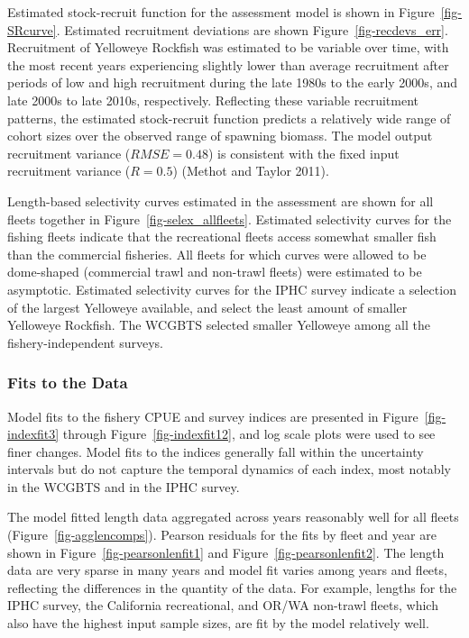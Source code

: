 \documentclass[
]{scrartcl}
\begin{document}
Estimated stock-recruit function for the assessment model is shown in
Figure~\ref{fig-SRcurve}. Estimated recruitment deviations are shown
Figure~\ref{fig-recdevs_err}. Recruitment of Yelloweye Rockfish was
estimated to be variable over time, with the most recent years
experiencing slightly lower than average recruitment after periods of
low and high recruitment during the late 1980s to the early 2000s, and
late 2000s to late 2010s, respectively. Reflecting these variable
recruitment patterns, the estimated stock-recruit function predicts a
relatively wide range of cohort sizes over the observed range of
spawning biomass. The model output recruitment variance
(\(RMSE = 0.48\)) is consistent with the fixed input recruitment
variance (\(R = 0.5\)) (Methot and Taylor 2011).

Length-based selectivity curves estimated in the assessment are shown
for all fleets together in Figure~\ref{fig-selex_allfleets}. Estimated
selectivity curves for the fishing fleets indicate that the recreational
fleets access somewhat smaller fish than the commercial fisheries. All
fleets for which curves were allowed to be dome-shaped (commercial trawl
and non-trawl fleets) were estimated to be asymptotic. Estimated
selectivity curves for the IPHC survey indicate a selection of the
largest Yelloweye available, and select the least amount of smaller
Yelloweye Rockfish. The WCGBTS selected smaller Yelloweye among all the
fishery-independent surveys.

\subsubsection{Fits to the Data}\label{fits-to-the-data}

Model fits to the fishery CPUE and survey indices are presented in
Figure~\ref{fig-indexfit3} through Figure~\ref{fig-indexfit12}, and log
scale plots were used to see finer changes. Model fits to the indices
generally fall within the uncertainty intervals but do not capture the
temporal dynamics of each index, most notably in the WCGBTS and in the
IPHC survey.

The model fitted length data aggregated across years reasonably well for
all fleets (Figure~\ref{fig-agglencomps}). Pearson residuals for the
fits by fleet and year are shown in Figure~\ref{fig-pearsonlenfit1} and
Figure~\ref{fig-pearsonlenfit2}. The length data are very sparse in many
years and model fit varies among years and fleets, reflecting the
differences in the quantity of the data. For example, lengths for the
IPHC survey, the California recreational, and OR/WA non-trawl fleets,
which also have the highest input sample sizes, are fit by the model
relatively well.
\end{document}
